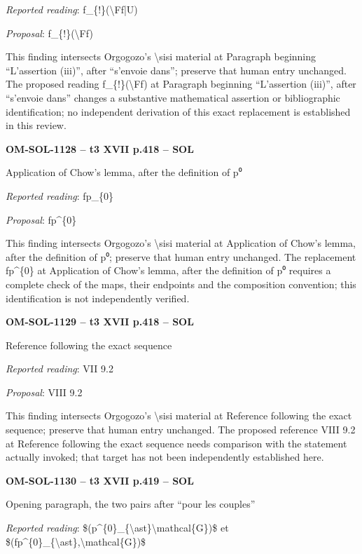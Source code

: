 \emph{Reported reading}: f\_\{!\}(\textbackslash{}Ff|U)\par
\emph{Proposal}: f\_\{!\}(\textbackslash{}Ff)\par
This finding intersects Orgogozo's \textbackslash{}sisi material at Paragraph beginning “L'assertion (iii)”, after “s'envoie dans”; preserve that human entry unchanged. The proposed reading f\_\{!\}(\textbackslash{}Ff) at Paragraph beginning “L'assertion (iii)”, after “s'envoie dans” changes a substantive mathematical assertion or bibliographic identification; no independent derivation of this exact replacement is established in this review.\par
\par\noindent\textbf{OM-SOL-1128 -- t3 XVII p.418 -- SOL}\par
Application of Chow's lemma, after the definition of p⁰\par
\emph{Reported reading}: fp\_\{0\}\par
\emph{Proposal}: fp\textasciicircum{}\{0\}\par
This finding intersects Orgogozo's \textbackslash{}sisi material at Application of Chow's lemma, after the definition of p⁰; preserve that human entry unchanged. The replacement fp\textasciicircum{}\{0\} at Application of Chow's lemma, after the definition of p⁰ requires a complete check of the maps, their endpoints and the composition convention; this identification is not independently verified.\par
\par\noindent\textbf{OM-SOL-1129 -- t3 XVII p.418 -- SOL}\par
Reference following the exact sequence\par
\emph{Reported reading}: VII 9.2\par
\emph{Proposal}: VIII 9.2\par
This finding intersects Orgogozo's \textbackslash{}sisi material at Reference following the exact sequence; preserve that human entry unchanged. The proposed reference VIII 9.2 at Reference following the exact sequence needs comparison with the statement actually invoked; that target has not been independently established here.\par
\par\noindent\textbf{OM-SOL-1130 -- t3 XVII p.419 -- SOL}\par
Opening paragraph, the two pairs after “pour les couples”\par
\emph{Reported reading}: \$(p\textasciicircum{}\{0\}\_\{\textbackslash{}ast\}\textbackslash{}mathcal\{G\})\$ et \$(fp\textasciicircum{}\{0\}\_\{\textbackslash{}ast\},\textbackslash{}mathcal\{G\})\$\par
